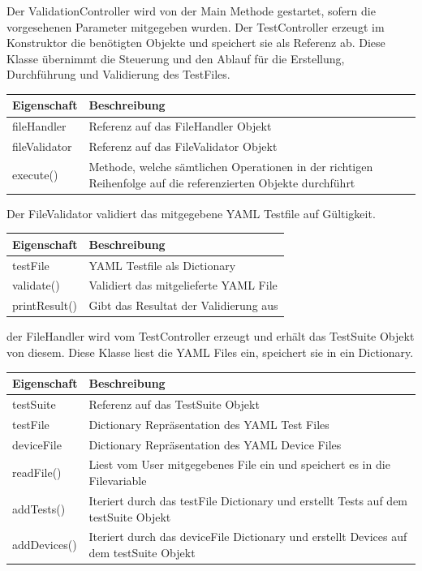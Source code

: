 \documentclass[a4,12pt]{scrartcl}
\begin{document}
Der ValidationController wird von der Main Methode gestartet, sofern die vorgesehenen Parameter mitgegeben wurden. Der TestController erzeugt im Konstruktor die benötigten Objekte und speichert sie als Referenz ab. Diese Klasse übernimmt die Steuerung und den Ablauf für die Erstellung, Durchführung und Validierung des TestFiles.
\noindent \begin{table}[H]
\centering
    \begin{tabular}{@{}l p{12cm} @{}}\toprule    
    {Eigenschaft} & {Beschreibung}\\ \midrule      
    fileHandler & Referenz auf das FileHandler Objekt \\
    fileValidator & Referenz auf das FileValidator Objekt\\
    execute() & Methode, welche sämtlichen Operationen in der richtigen Reihenfolge auf die referenzierten Objekte durchführt\\
    \bottomrule
    \end{tabular}
\end{table}

Der FileValidator validiert das mitgegebene YAML Testfile auf Gültigkeit.
\noindent \begin{table}[H]
\centering
    \begin{tabular}{@{}l p{12cm} @{}}\toprule    
    {Eigenschaft} & {Beschreibung}\\ \midrule      
    testFile & YAML Testfile als Dictionary \\
    validate() & Validiert das mitgelieferte YAML File\\
    printResult() & Gibt das Resultat der Validierung aus\\
    \bottomrule
    \end{tabular}
\end{table}

der FileHandler wird vom TestController erzeugt und erhält das TestSuite Objekt von diesem. Diese Klasse liest die YAML Files ein, speichert sie in ein Dictionary.
\noindent \begin{table}[H]
\centering
    \begin{tabular}{@{}l p{12cm} @{}}\toprule    
    {Eigenschaft} & {Beschreibung}\\ \midrule
    testSuite & Referenz auf das TestSuite Objekt  \\
    testFile & Dictionary Repräsentation des YAML Test Files\\
    deviceFile & Dictionary Repräsentation des YAML Device Files\\    
    readFile() & Liest vom User mitgegebenes File ein und speichert es in die Filevariable \\
    addTests() & Iteriert durch das testFile Dictionary und erstellt Tests auf dem testSuite Objekt \\
    addDevices() & Iteriert durch das deviceFile Dictionary und erstellt Devices auf dem testSuite Objekt\\
    \bottomrule
    \end{tabular}
\end{table}
\end{document}
